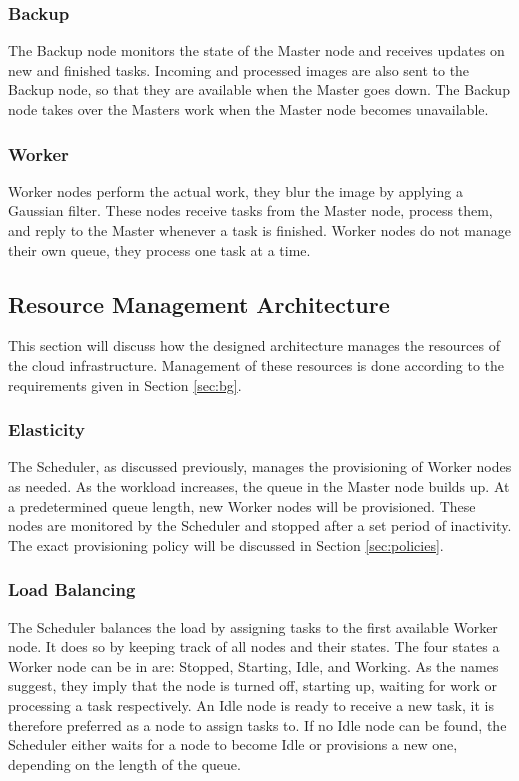 \documentclass{acm_proc_article-sp}
\begin{document}
\subsubsection{Backup}
The Backup node monitors the state of the Master node and receives updates on new and finished tasks.
Incoming and processed images are also sent to the Backup node, so that they are available when the Master goes down.
The Backup node takes over the Masters work when the Master node becomes unavailable.

\subsubsection{Worker}
Worker nodes perform the actual work, they blur the image by applying a Gaussian filter.
These nodes receive tasks from the Master node, process them, and reply to the Master whenever a task is finished.
Worker nodes do not manage their own queue, they process one task at a time.


\subsection{Resource Management Architecture}
\label{sec:resource_man}
This section will discuss how the designed architecture manages the resources of the cloud infrastructure.
Management of these resources is done according to the requirements given in Section \ref{sec:bg}.

\subsubsection{Elasticity}
The Scheduler, as discussed previously, manages the provisioning of Worker nodes as needed.
As the workload increases, the queue in the Master node builds up.
At a predetermined queue length, new Worker nodes will be provisioned.
These nodes are monitored by the Scheduler and stopped after a set period of inactivity.
The exact provisioning policy will be discussed in Section \ref{sec:policies}.

\subsubsection{Load Balancing}
The Scheduler balances the load by assigning tasks to the first available Worker node.
It does so by keeping track of all nodes and their states.
The four states a Worker node can be in are: Stopped, Starting, Idle, and Working.
As the names suggest, they imply that the node is turned off, starting up, waiting for work or processing a task respectively.
An Idle node is ready to receive a new task, it is therefore preferred as a node to assign tasks to.
If no Idle node can be found, the Scheduler either waits for a node to become Idle or provisions a new one, depending on the length of the queue.
\end{document}
